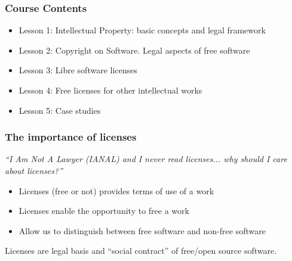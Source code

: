 \documentclass{beamer}
\begin{document}

\begin{frame}
  \frametitle{Course Contents}

  \begin{itemize}
    \item \alert{Lesson 1: Intellectual Property: basic concepts and legal framework}
    \item Lesson 2: Copyright on Software. Legal aspects of free software
    \item Lesson 3: Libre software licenses
    \item Lesson 4: Free licenses for other intellectual works
    \item Lesson 5: Case studies
  \end{itemize}

\end{frame}





\begin{frame}
\frametitle{The importance of licenses}
\textit{``\alert{I} \alert{A}m \alert{N}ot \alert{A} \alert{L}awyer (IANAL) and I never read licenses... why should I care about licenses?''}

\pause

\begin{itemize}[<+->]
\item Licenses (free or not) provides terms of use of a work
\item Licenses enable the opportunity to free a work
\item Allow us to distinguish between free software and non-free software
\end{itemize}

\pause
\begin{center}
\alert{Licenses are legal basis and ``social contract'' of free/open source software.}
\end{center}

\end{frame}
\end{document}
